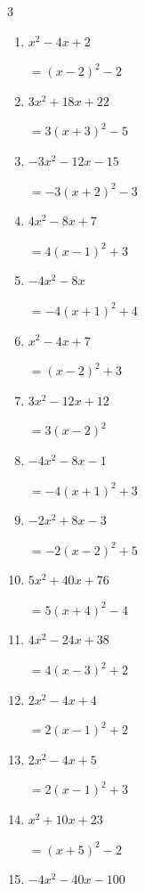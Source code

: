 \begin{multicols}{3}
\begin{enumerate}
  \item $x^{2}-4x+2$

        $=\left( x-2\right)^{2}-2$

  \item $3x^{2}+18x+22$

        $=3\left( x+3\right)^{2}-5$

  \item $-3x^{2}-12x-15$

        $=-3\left( x+2\right)^{2}-3$

  \item $4x^{2}-8x+7$

        $=4\left( x-1\right)^{2}+3$

  \item $-4x^{2}-8x$

        $=-4\left( x+1\right)^{2}+4$

  \item $x^{2}-4x+7$

        $=\left( x-2\right)^{2}+3$

  \item $3x^{2}-12x+12$

        $=3\left( x-2\right)^{2}$

\columnbreak %

  \item $-4x^{2}-8x-1$

        $=-4\left( x+1\right)^{2}+3$

  \item $-2x^{2}+8x-3$

        $=-2\left( x-2\right)^{2}+5$

  \item $5x^{2}+40x+76$

        $=5\left( x+4\right)^{2}-4$

  \item $4x^{2}-24x+38$

        $=4\left( x-3\right)^{2}+2$

  \item $2x^{2}-4x+4$

        $=2\left( x-1\right)^{2}+2$

  \item $2x^{2}-4x+5$

        $=2\left( x-1\right)^{2}+3$

  \item $x^{2}+10x+23$

        $=\left( x+5\right)^{2}-2$

  \item $-4x^{2}-40x-100$


\end{enumerate}
\end{multicols}
